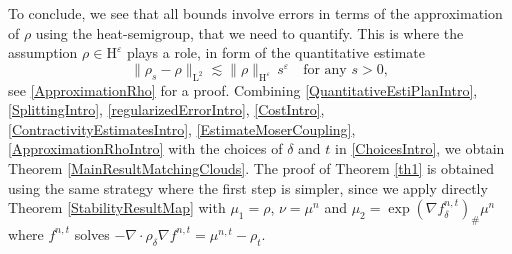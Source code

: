 \documentclass[11pt,a4paper,oneside]{amsart}
\numberwithin{equation}{section}
\newcommand{\LL}{\mathrm{L}}
\begin{document}
%
\medskip
%

To conclude, we see that all bounds involve errors in terms of the approximation of $\rho$ using the heat-semigroup, that we need to quantify. This is where the assumption $\rho\in \mathrm{H}^\varepsilon$ plays a role, in form of the quantitative estimate 
%
\begin{equation}\label{ApproximationRhoIntro}
%
\|\rho_s-\rho\|_{\LL^2}\lesssim \|\rho\|_{\mathrm{H}^\varepsilon} \,s^{\varepsilon}\quad\text{for any $s>0$},
%
\end{equation}
%
see \eqref{ApproximationRho} for a proof. Combining \eqref{QuantitativeEstiPlanIntro}, \eqref{SplittingIntro}, \eqref{regularizedErrorIntro}, \eqref{CostIntro}, \eqref{ContractivityEstimatesIntro}, \eqref{EstimateMoserCoupling}, \eqref{ApproximationRhoIntro} with the choices of $\delta$ and $t$ in \eqref{ChoicesIntro}, we obtain Theorem \ref{MainResultMatchingClouds}. The proof of Theorem \ref{th1} is obtained using the same strategy where the first step is simpler, since we apply directly Theorem \ref{StabilityResultMap} with $\mu_1=\rho$, $\nu=\mu^n$ and $\mu_2=\exp(\nabla f^{n,t}_\delta)_\#\mu^n$ where $f^{n,t}$ solves $-\nabla\cdot \rho_\delta\nabla f^{n,t}=\mu^{n,t}-\rho_t$.


%
%
\end{document}
